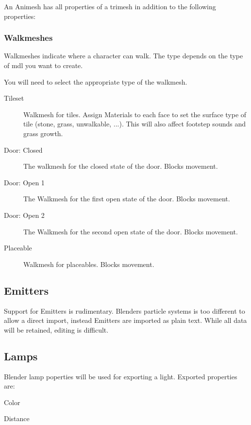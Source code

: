 An Animesh has all properties of a trimesh in addition to the following
properties:

\subsubsection{Walkmeshes}
Walkmeshes indicate where a character can walk. The type depends on the type
of mdl you want to create.

You will need to select the appropriate type of the walkmesh.
\begin{description}
    \item[Tileset] Walkmesh for tiles. Assign Materials to each face to set the
                   surface type of tile (stone, grass, unwalkable, ...).
                   This will also affect footstep sounds and grass growth.
    \item[Door: Closed] The walkmesh for the closed state of the door. Blocks movement.
    \item[Door: Open 1] The Walkmesh for the first open state of the door. Blocks movement.
    \item[Door: Open 2] The Walkmesh for the second open state of the door. Blocks movement.
    \item[Placeable] Walkmesh for placeables. Blocks movement.
\end{description}

\subsection{Emitters}
Support for Emitters is rudimentary. Blenders particle systems is too
different to allow a direct import, instead Emitters are imported as plain
text. While all data will be retained, editing is difficult.

\subsection{Lamps}
Blender lamp poperties will be used for exporting a light.
Exported properties are:
\begin{list}
    \item Color
    \item Distance
\end{list}

